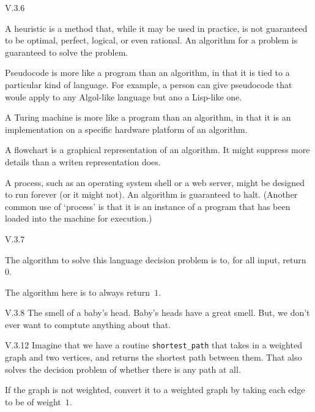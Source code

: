 %
%
\begin{ans}{V.3.6}
\begin{exparts}
\item A heuristic is a method that, while it may be used in practice,
is not guaranteed to be optimal, perfect, logical, or even rational.
An algorithm for a problem is guaranteed to solve the problem.
\item Pseudocode is more like a program than an algorithm, in that
it is tied to a particular kind of language.
For example, a person can give pseudocode that woule apply to any
Algol-like language but ano a Lisp-like one.
\item A Turing machine is more like a program than an algorithm, in that
it is an implementation on a specific hardware platform of an algorithm.
\item A flowchart is a graphical representation of an algorithm.
It might suppress more details than a writen representation does.
\item A process, such as an operating system shell or a web server, might
be designed to run forever (or it might not).
An algorithm is guaranteed to halt.
(Another common use of `process' is that it is an instance of a program that has
been loaded into the machine for execution.)
\end{exparts}
\end{ans}
%
\begin{ans}{V.3.7}
\begin{exparts}
\item The algorithm to solve this language decision problem is to, for all
input, return~$0$.
\item The algorithm here is to always return~$1$.
\end{exparts}
\end{ans}
%
\begin{ans}{V.3.8}
The smell of a baby's head.
Baby's heads have a great smell.
But, we don't ever want to comptute anything about that.
\end{ans}
%
%
%
%
\begin{ans}{V.3.12}
Imagine that we have a routine \texttt{shortest\_path} that takes in a
weighted graph and two vertices, and returns the shortest path between them.
That also solves the decision problem of whether there is any path at all.

If the graph is not weighted, convert it to a weighted graph by
taking each edge to be of weight~$1$.
\end{ans}
